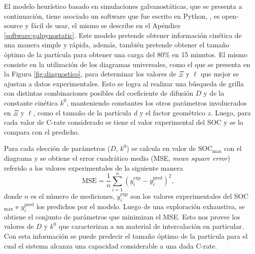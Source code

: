 El modelo heurístico basado en simulaciones galvanostáticas, que se presenta a 
continuación, tiene asociado un software que fue escrito en Python, 
, es open-source y fácil de usar, el mismo se describe en el
Apéndice \ref{software:galpynostatic}. Este modelo pretende obtener información
cinética de una manera simple y rápida, además, también pretende obtener el 
tamaño óptimo de la partícula para obtener una carga del 80\% en 15 minutos.
El mismo consiste en la utilización de los diagramas universales, como el que 
se presenta en la Figura \ref{fig:diagnostico}, para determinar los valores de
$\Xi$ y $\ell$ que mejor se ajustan a datos experimentales. Esto se logra al 
realizar una búsqueda de grilla con distintas combinaciones posibles del 
coeficiente de difusión $D$ y de la constante cinética $k^0$, manteniendo 
constantes los otros parámetros involucrados en $\Xi$ y $\ell$, como el tamaño 
de la partícula $d$ y el factor geométrico $z$. Luego, para cada valor de C-rate
considerado se tiene el valor experimental del SOC y se lo compara con el 
predicho.

Para cada elección de parámetros ($D$, $k^0$) se calcula en valor de 
$\text{SOC}_{\max}$ con el diagrama y se obtiene el error cuadrático medio (MSE,
\textit{mean square error}) referido a los valores experimentales de la siguiente
manera
\begin{equation}
    \text{MSE} = \frac{1}{n} \sum_{i=1}^n \left(y_i^{\text{exp}} - y_i^{\text{pred}}\right)^2,
\end{equation}
donde $n$ es el número de mediciones, $y_i^{\exp}$ son los valores 
experimentales del SOC$_{\max}$ e $y_i^{\text{pred}}$ los predichos por el 
modelo. Luego de una exploración exhaustiva, se obtiene el conjunto de 
parámetros que minimizan el MSE. Esto nos provee los valores de $D$ y $k^0$ que
caracterizan a un material de intercalación en particular. Con esta información
se puede predecir el tamaño óptimo de la partícula para el cual el sistema 
alcanza una capacidad considerable a una dada C-rate.
